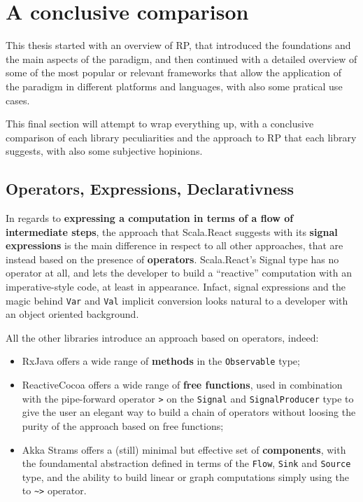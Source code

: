 \chapter{A conclusive comparison}\label{a-conclusive-comparison}

This thesis started with an overview of RP, that introduced the
foundations and the main aspects of the paradigm, and then continued
with a detailed overview of some of the most popular or relevant
frameworks that allow the application of the paradigm in different
platforms and languages, with also some pratical use cases.

This final section will attempt to wrap everything up, with a conclusive
comparison of each library peculiarities and the approach to RP that
each library suggests, with also some subjective hopinions.

\section{Operators, Expressions,
Declarativness}\label{operators-expressions-declarativness}

In regards to \textbf{expressing a computation in terms of a flow of
intermediate steps}, the approach that Scala.React suggests with its
\textbf{signal expressions} is the main difference in respect to all
other approaches, that are instead based on the presence of
\textbf{operators}. Scala.React's Signal type has no operator at all,
and lets the developer to build a ``reactive'' computation with an
imperative-style code, at least in appearance. Infact, signal
expressions and the magic behind \texttt{Var} and \texttt{Val} implicit
conversion looks natural to a developer with an object oriented
background.

All the other libraries introduce an approach based on operators,
indeed:

\begin{itemize}
\itemsep1pt\parskip0pt
\item
  RxJava offers a wide range of \textbf{methods} in the
  \texttt{Observable} type;
\item
  ReactiveCocoa offers a wide range of \textbf{free functions}, used in
  combination with the pipe-forward operator
  \texttt{\textbar{}\textgreater{}} on the \texttt{Signal} and
  \texttt{SignalProducer} type to give the user an elegant way to build
  a chain of operators without loosing the purity of the approach based
  on free functions;
\item
  Akka Strams offers a (still) minimal but effective set of
  \textbf{components}, with the foundamental abstraction defined in
  terms of the \texttt{Flow}, \texttt{Sink} and \texttt{Source} type,
  and the ability to build linear or graph computations simply using the
  to \texttt{\textasciitilde{}\textgreater{}} operator.
\end{itemize}

